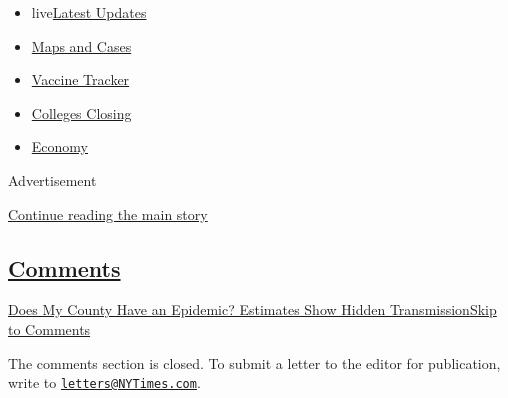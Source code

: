 \begin{itemize}
\tightlist
\item
  live\href{https://www.nytimes3xbfgragh.onion/2020/08/20/world/coronavirus-covid.html?name=styln-coronavirus-national\&region=TOP_BANNER\&variant=undefined\&block=storyline_menu_recirc\&action=click\&pgtype=Interactive\&impression_id=3dcf04e1-e38e-11ea-b524-5975769cbb40}{Latest
  Updates}
\item
  \href{https://www.nytimes3xbfgragh.onion/interactive/2020/us/coronavirus-us-cases.html?name=styln-coronavirus-national\&region=TOP_BANNER\&variant=undefined\&block=storyline_menu_recirc\&action=click\&pgtype=Interactive\&impression_id=3dcf04e2-e38e-11ea-b524-5975769cbb40}{Maps
  and Cases}
\item
  \href{https://www.nytimes3xbfgragh.onion/interactive/2020/science/coronavirus-vaccine-tracker.html?name=styln-coronavirus-national\&region=TOP_BANNER\&variant=undefined\&block=storyline_menu_recirc\&action=click\&pgtype=Interactive\&impression_id=3dcf04e3-e38e-11ea-b524-5975769cbb40}{Vaccine
  Tracker}
\item
  \href{https://www.nytimes3xbfgragh.onion/2020/08/19/us/colleges-closing-covid.html?name=styln-coronavirus-national\&region=TOP_BANNER\&variant=undefined\&block=storyline_menu_recirc\&action=click\&pgtype=Interactive\&impression_id=3dcf04e4-e38e-11ea-b524-5975769cbb40}{Colleges
  Closing}
\item
  \href{https://www.nytimes3xbfgragh.onion/live/2020/08/20/business/stock-market-today-coronavirus?name=styln-coronavirus-national\&region=TOP_BANNER\&variant=undefined\&block=storyline_menu_recirc\&action=click\&pgtype=Interactive\&impression_id=3dcf04e5-e38e-11ea-b524-5975769cbb40}{Economy}
\end{itemize}

Advertisement

\protect\hyperlink{after-top}{Continue reading the main story}

\hypertarget{comments}{%
\subsection{\texorpdfstring{\protect\hyperlink{commentsContainer}{Comments}}{Comments}}\label{comments}}

\href{}{Does My County Have an Epidemic? Estimates Show Hidden
Transmission}\href{}{Skip to Comments}

The comments section is closed. To submit a letter to the editor for
publication, write to
\href{mailto:letters@NYTimes.com}{\nolinkurl{letters@NYTimes.com}}.

